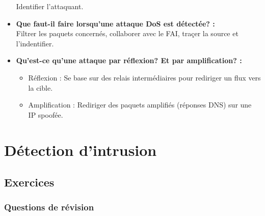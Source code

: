 \documentclass{report}
\begin{document}
\begin{itemize}
					Identifier l'attaquant.\\

				\item \textbf{Que faut-il faire lorsqu'une attaque DoS est détectée? : }\\

					Filtrer les paquets concernés, collaborer avec le FAI, traçer la source et l'indentifier.\\

				\item \textbf{Qu'est-ce qu'une attaque par réflexion? Et par amplification? :}\\

					\begin{itemize}
						\item Réflexion : Se base sur des relais intermédiaires pour rediriger un flux vers la cible.
						\item Amplification : Rediriger des paquets amplifiés (réponses DNS) sur une IP spoofée.
					\end{itemize}

			\end{itemize}

\chapter{Détection d'intrusion}

	\section{Exercices}

		\subsection{Questions de révision}
\end{document}
